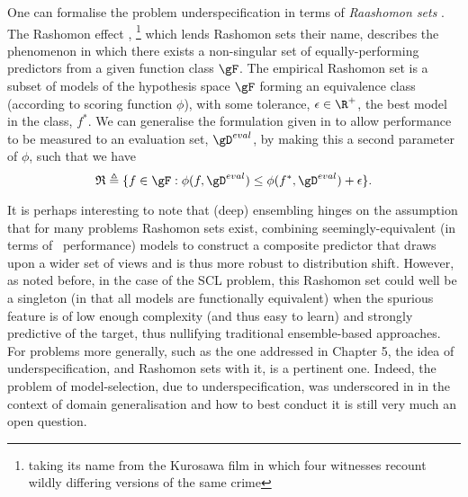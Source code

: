%
One can formalise the problem underspecification in terms of \emph{Raashomon sets}
\citep{semenova2019study}.
The Rashomon effect \citep{breiman2001statistical},
%
\footnote{taking its name from the Kurosawa film
in which four witnesses recount wildly differing versions of the same crime}
%
which lends Rashomon sets their name, describes the phenomenon in which there exists a
non-singular set of equally-performing predictors from a given function class $\gF$.
%
 The empirical Rashomon set is a subset of models of the hypothesis space $\gF$ forming an
 equivalence class (according to scoring function $\phi$), with some tolerance, $\epsilon \in \R^+$, \wrt{}
 the best model in the class, $f^\ast$. 
%
We can generalise the formulation given in \citet{semenova2019study} to allow performance to be
measured \wrt{} to an evaluation set,  $\gD^{eval}$, by making this a second parameter of
$\phi$, such that we have
%
\begin{equation*}
  \frak{R} \triangleq 
  \{ 
    f \in \gF: \phi(f, \gD^{eval}) 
    \leq 
    \phi( f^\ast, \gD^{eval} ) + \epsilon 
  \}.
\end{equation*}

It is perhaps interesting to note that (deep) ensembling hinges on the assumption that for many
problems Rashomon sets exist, combining seemingly-equivalent (in terms of \iid{}\ performance)
models to construct a composite predictor that draws upon a wider set of views and is thus more
robust to distribution shift.
%
However, as noted before, in the case of the SCL problem, this Rashomon set could well be a
singleton (in that all models are functionally equivalent) when the spurious feature is of low
enough complexity (and thus easy to learn) and strongly predictive of the target, thus nullifying
traditional ensemble-based approaches.
%
For \ood{} problems more generally, such as the one addressed in Chapter 5, the idea of
underspecification, and Rashomon sets with it, is a pertinent one.
%
Indeed, the problem of model-selection, due to underspecification, was underscored in
\cite{gulrajani2020search} in the context of domain generalisation and how to best conduct it is
still very much an open question.

